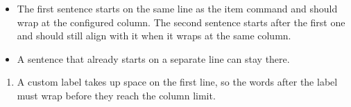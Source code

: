 \begin{itemize}
    \item The first sentence starts on the same line as the item command and should wrap at the configured column. The second sentence starts after the first one and should still align with it when it wraps at the same column.
    \item
        A sentence that already starts on a separate line can stay there.
\end{itemize}
\begin{enumerate}
    \item[Review]A custom label takes up space on the first line, so the words after the label must wrap before they reach the column limit.
\end{enumerate}

